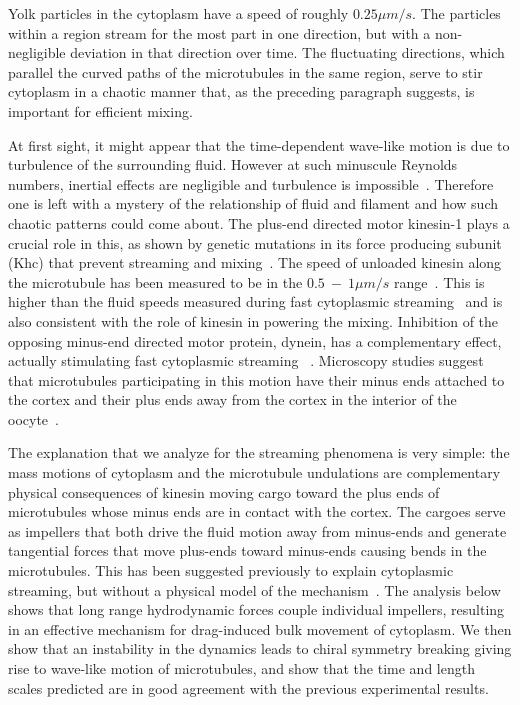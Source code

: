 \documentclass[11pt]{ucthesis}
\begin{document}
Yolk particles in the
cytoplasm have a speed of roughly $0.25 \mu m/s$.  The particles
within a region stream for the most part in one direction,
but with a non-negligible deviation in that direction over
time. The fluctuating directions, which parallel the curved paths of
the microtubules in the same region, serve to stir cytoplasm
in a chaotic manner that, as the preceding paragraph suggests,
is important for efficient mixing.

At first sight, it might appear that the time-dependent wave-like
motion is due to turbulence of the surrounding fluid. However at such minuscule Reynolds
numbers, inertial effects are negligible and turbulence is
impossible~\cite{BergRandomWalksinBiology}. Therefore one is left with a mystery of
the relationship of fluid and filament and
how such chaotic patterns could come about. The plus-end
directed motor kinesin-1 plays a crucial role in this, as
shown by 
genetic mutations in its force producing subunit (Khc)  that prevent streaming and mixing~\cite{SerbusSaxton}.
The speed of unloaded kinesin along the microtubule has been
measured to be in the $0.5 ~-~ 1 \mu m/s$ range~\cite{SvobodaBlock,MeyhoferHoward}.  This is higher
than the fluid speeds measured during fast cytoplasmic streaming~\cite{SerbusSaxton}
and is also consistent with the role of kinesin in powering
the mixing.
Inhibition of the opposing minus-end directed motor protein,
dynein, has a complementary effect,
actually stimulating fast cytoplasmic streaming ~\cite{SerbusSaxton}.  Microscopy studies
suggest that microtubules participating in this motion have their
minus ends attached to the cortex and their plus ends away from
the cortex in the interior of the oocyte~\cite{SerbusSaxton,ChaSerbus}.  

The explanation
that we analyze for the streaming phenomena is very simple: the
mass motions of cytoplasm and the microtubule undulations are complementary
physical consequences of kinesin moving cargo 
toward the plus ends of microtubules whose minus ends
are in contact with the cortex. The cargoes serve as impellers that
both drive the fluid motion away from minus-ends and generate
tangential forces that move plus-ends toward minus-ends causing
bends in the microtubules. This has been suggested previously to
explain cytoplasmic streaming, but without a physical model of the
mechanism~\cite{SerbusSaxton}. The analysis below shows that long range hydrodynamic
forces couple individual impellers, resulting in an effective
mechanism for drag-induced bulk movement of cytoplasm.  We then
show that an instability in the dynamics leads to chiral symmetry breaking giving rise to
wave-like motion of microtubules, and show that the time and length scales
predicted are in good agreement with the previous experimental
results.
\end{document}
